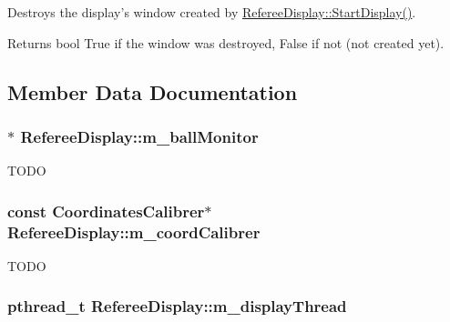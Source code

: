 Destroys the display's window created by \hyperlink{classRefereeDisplay_a6b789ef1ca73c72556cf5051a8a2b5a6}{RefereeDisplay::StartDisplay()}. 

\begin{DoxyReturn}{Returns}
bool True if the window was destroyed, False if not (not created yet). 
\end{DoxyReturn}


\subsection{Member Data Documentation}
\hypertarget{classRefereeDisplay_ab3a1d764a476c413ed1f19be2c9a1215}{
\subsubsection[{m\_\-ballMonitor}]{$\ast$ {\bf RefereeDisplay::m\_\-ballMonitor}}}
\label{classRefereeDisplay_ab3a1d764a476c413ed1f19be2c9a1215}
TODO \hypertarget{classRefereeDisplay_a7be832637684b08b915a2ff3c6c0d9f2}{
\subsubsection[{m\_\-coordCalibrer}]{\setlength{\rightskip}{0pt plus 5cm}const {\bf CoordinatesCalibrer}$\ast$ {\bf RefereeDisplay::m\_\-coordCalibrer}}}
\label{classRefereeDisplay_a7be832637684b08b915a2ff3c6c0d9f2}
TODO \hypertarget{classRefereeDisplay_aded3908927ad3726777ece4d52cf3ca2}{
\subsubsection[{m\_\-displayThread}]{\setlength{\rightskip}{0pt plus 5cm}pthread\_\-t {\bf RefereeDisplay::m\_\-displayThread}}}
